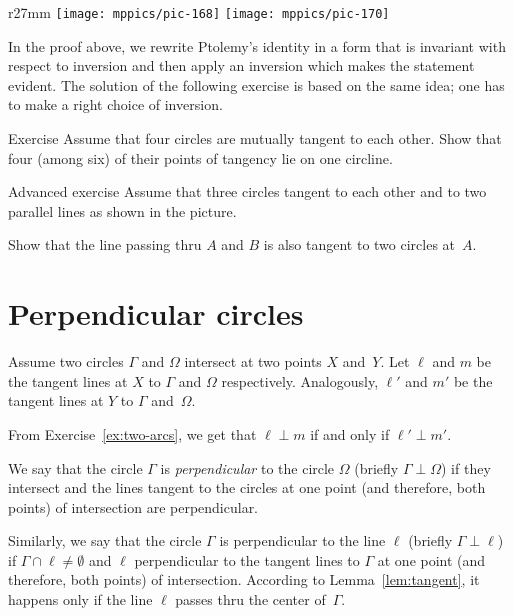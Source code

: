 {

\begin{wrapfigure}{r}{27mm}
\vskip-4mm
\centering
\texttt{[image: mppics/pic-168]}
\vskip4mm
\texttt{[image: mppics/pic-170]}
\end{wrapfigure}


In the proof above, we rewrite Ptolemy's identity in a form that is invariant with respect to inversion 
and then apply an inversion which makes the statement evident.
The solution of the following exercise is based on the same idea;
one has to make a right choice of inversion.



\begin{thm}{Exercise}\label{ex:4-circles}
Assume that four circles are mutually tangent to each other.
Show that four (among six) of their points of tangency lie on one circline.
\end{thm}


\begin{thm}{Advanced exercise}\label{ex:inverse}
Assume that three circles tangent to each other and to two parallel lines as shown in the picture.

Show that the line passing thru $A$ and $B$ is also tangent to two circles at~$A$.
\end{thm}

}

\section*{Perpendicular circles}

Assume two circles $\Gamma$ and $\Omega$ intersect at two points $X$ and~$Y$.
Let $\ell$ and $m$ be the tangent lines at $X$ to $\Gamma$ and $\Omega$ respectively.
Analogously, $\ell'$ and $m'$ be the tangent lines at $Y$ to $\Gamma$ and~$\Omega$.

From Exercise~\ref{ex:two-arcs}, we get that  
 $\ell\perp m$ if and only if $\ell'\perp m'$.

We say that the circle $\Gamma$ is {}\emph{perpendicular} to the circle $\Omega$ 
(briefly $\Gamma\perp \Omega$)
if they intersect and the lines tangent to the circles at one point 
(and therefore, both points) 
of intersection are perpendicular.

Similarly, we say that the circle $\Gamma$ is perpendicular to the line $\ell$ (briefly $\Gamma\perp \ell$)
if $\Gamma\cap\ell\ne \emptyset$ and $\ell$ perpendicular to the tangent lines to $\Gamma$ at one point (and therefore, both points) of intersection.
According to Lemma~\ref{lem:tangent}, 
it happens only if the line $\ell$ passes thru the center of~$\Gamma$.

